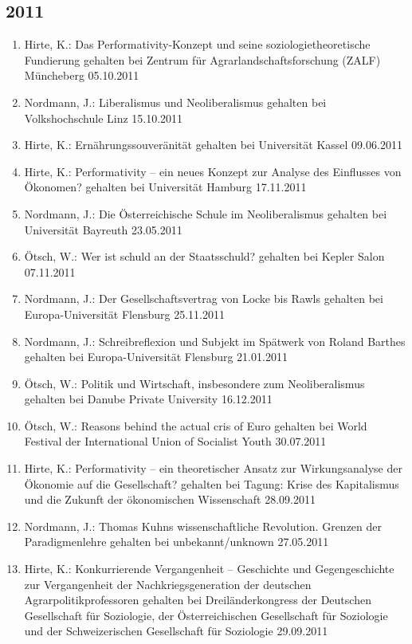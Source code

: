 \subsection*{2011}
\begin{enumerate}
	\item Hirte, K.: Das Performativity-Konzept und seine soziologietheoretische Fundierung gehalten bei Zentrum für Agrarlandschaftsforschung (ZALF) Müncheberg 05.10.2011
	\item Nordmann, J.: Liberalismus und Neoliberalismus gehalten bei Volkshochschule Linz 15.10.2011
	\item Hirte, K.: Ernährungssouveränität gehalten bei Universität Kassel 09.06.2011
	\item Hirte, K.: Performativity -- ein neues Konzept zur Analyse des Einflusses von Ökonomen? gehalten bei Universität Hamburg 17.11.2011
	\item Nordmann, J.: Die Österreichische Schule im Neoliberalismus gehalten bei Universität Bayreuth 23.05.2011
	\item Ötsch, W.: Wer ist schuld an der Staatsschuld? gehalten bei Kepler Salon 07.11.2011
	\item Nordmann, J.: Der Gesellschaftsvertrag von Locke bis Rawls gehalten bei Europa-Universität Flensburg 25.11.2011
	\item Nordmann, J.: Schreibreflexion und Subjekt im Spätwerk von Roland Barthes gehalten bei Europa-Universität Flensburg 21.01.2011
	\item Ötsch, W.: Politik und Wirtschaft, insbesondere zum Neoliberalismus gehalten bei Danube Private University 16.12.2011
	\item Ötsch, W.: Reasons behind the actual cris of Euro gehalten bei World Festival der International Union of Socialist Youth 30.07.2011
	\item Hirte, K.: Performativity -- ein theoretischer Ansatz zur Wirkungsanalyse der Ökonomie auf die Gesellschaft? gehalten bei Tagung: Krise des Kapitalismus und die Zukunft der ökonomischen Wissenschaft 28.09.2011
	\item Nordmann, J.: Thomas Kuhns wissenschaftliche Revolution. Grenzen der Paradigmenlehre gehalten bei unbekannt/unknown 27.05.2011
	\item Hirte, K.: Konkurrierende Vergangenheit -- Geschichte und Gegengeschichte zur Vergangenheit der Nachkriegsgeneration der deutschen Agrarpolitikprofessoren gehalten bei Dreiländerkongress der Deutschen Gesellschaft für Soziologie, der Österreichischen Gesellschaft für Soziologie und der Schweizerischen Gesellschaft für Soziologie 29.09.2011

\end{enumerate}
